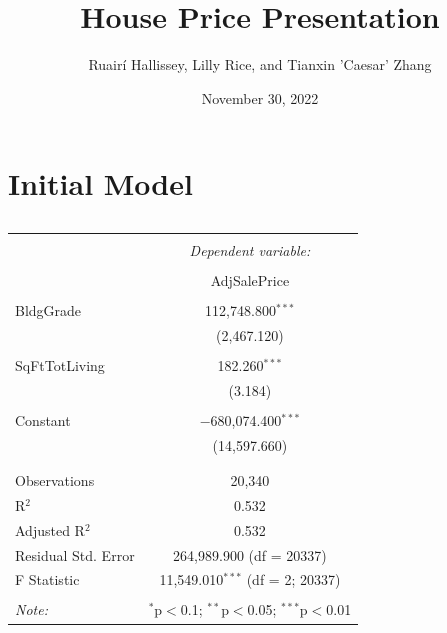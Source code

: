 \documentclass[12pt,letterpaper]{article}
\title{House Price Presentation}
\date{November 30, 2022}
\author{Ruairí Hallissey, Lilly Rice, and Tianxin 'Caesar' Zhang}
\begin{document}
	\maketitle
\newpage
\section{Initial Model}
\begin{table}[!htbp] \centering 
	\caption{} 
	\label{} 
	\begin{tabular}{@{\extracolsep{5pt}}lc} 
		\\[-1.8ex]\hline 
		\hline \\[-1.8ex] 
		& \multicolumn{1}{c}{\textit{Dependent variable:}} \\ 
		\cline{2-2} 
		\\[-1.8ex] & AdjSalePrice \\ 
		\hline \\[-1.8ex] 
		BldgGrade & 112,748.800$^{***}$ \\ 
		& (2,467.120) \\ 
		& \\ 
		SqFtTotLiving & 182.260$^{***}$ \\ 
		& (3.184) \\ 
		& \\ 
		Constant & $-$680,074.400$^{***}$ \\ 
		& (14,597.660) \\ 
		& \\ 
		\hline \\[-1.8ex] 
		Observations & 20,340 \\ 
		R$^{2}$ & 0.532 \\ 
		Adjusted R$^{2}$ & 0.532 \\ 
		Residual Std. Error & 264,989.900 (df = 20337) \\ 
		F Statistic & 11,549.010$^{***}$ (df = 2; 20337) \\ 
		\hline 
		\hline \\[-1.8ex] 
		\textit{Note:}  & \multicolumn{1}{r}{$^{*}$p$<$0.1; $^{**}$p$<$0.05; $^{***}$p$<$0.01} \\ 
	\end{tabular} 
\end{table}

\newpage
\end{document}
